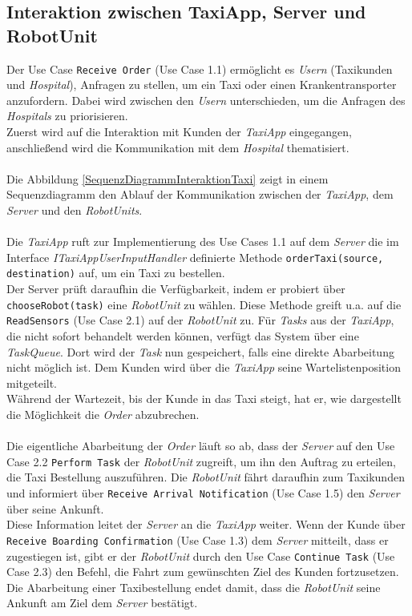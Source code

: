 \subsection*{Interaktion zwischen TaxiApp, Server und RobotUnit}

Der Use Case \texttt{Receive Order} (Use Case 1.1) ermöglicht es \emph{Usern} (Taxikunden und \emph{Hospital}), Anfragen zu stellen, um ein Taxi oder einen Krankentransporter anzufordern. Dabei wird zwischen den \emph{Usern} unterschieden, um die Anfragen des \emph{Hospitals} zu priorisieren.\\
Zuerst wird auf die Interaktion mit Kunden der \emph{TaxiApp} eingegangen, anschließend wird die Kommunikation mit dem \emph{Hospital} thematisiert. \\ \\

Die Abbildung \ref{SequenzDiagrammInteraktionTaxi} zeigt in einem Sequenzdiagramm den Ablauf der Kommunikation zwischen der \emph{TaxiApp}, dem \emph{Server} und den \emph{RobotUnits}.\\ \\
Die \emph{TaxiApp} ruft zur Implementierung des Use Cases 1.1 auf dem \emph{Server} die im Interface \emph{ITaxiAppUserInputHandler} definierte Methode \texttt{orderTaxi(source, destination)} auf, um ein Taxi zu bestellen. \\ Der Server prüft daraufhin die Verfügbarkeit, indem er probiert über \texttt{chooseRobot(task)} eine \emph{RobotUnit} zu wählen. Diese Methode greift u.a. auf die \texttt{ReadSensors} (Use Case 2.1) auf der \emph{RobotUnit} zu.
Für \emph{Tasks} aus der \emph{TaxiApp}, die nicht sofort behandelt werden können, verfügt das System über eine \emph{TaskQueue}. Dort wird der \emph{Task} nun gespeichert, falls eine direkte Abarbeitung nicht möglich ist. Dem Kunden wird über die \emph{TaxiApp} seine Wartelistenposition mitgeteilt. \\
Während der Wartezeit, bis der Kunde in das Taxi steigt, hat er, wie dargestellt die Möglichkeit die \emph{Order} abzubrechen. \\ \\
Die eigentliche Abarbeitung der \emph{Order} läuft so ab, dass der \emph{Server} auf den Use Case 2.2 \texttt{Perform Task} der \emph{RobotUnit} zugreift, um ihn den Auftrag zu erteilen, die Taxi Bestellung auszuführen. Die \emph{RobotUnit} fährt daraufhin zum Taxikunden und informiert über \texttt{Receive Arrival Notification} (Use Case 1.5) den \emph{Server} über seine Ankunft. \\
Diese Information leitet der \emph{Server} an die \emph{TaxiApp} weiter. Wenn der Kunde über \texttt{Receive Boarding Confirmation} (Use Case 1.3) dem \emph{Server} mitteilt, dass er zugestiegen ist, gibt er der \emph{RobotUnit} durch den Use Case \texttt{Continue Task} (Use Case 2.3) den Befehl, die Fahrt zum gewünschten Ziel des Kunden fortzusetzen. Die Abarbeitung einer Taxibestellung endet damit, dass die \emph{RobotUnit} seine Ankunft am Ziel dem \emph{Server} bestätigt.

